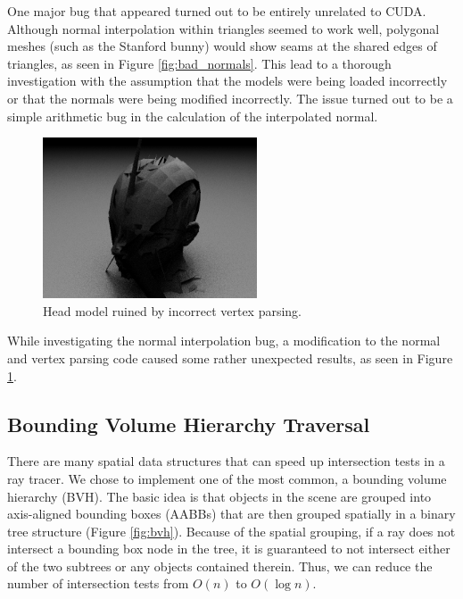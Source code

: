 \documentclass{acmsiggraph}                     %
\begin{document}
    One major bug that appeared turned out to be entirely unrelated to CUDA.  Although normal 
    interpolation within triangles seemed to work well, polygonal meshes (such as the Stanford bunny) would 
    show seams at the shared edges of triangles, as seen in Figure \ref{fig:bad_normals}.
    This lead to a thorough investigation with the assumption that the models were being loaded 
    incorrectly or that the normals were being modified incorrectly. The issue turned out to be 
    a simple arithmetic bug in the calculation of the interpolated normal. 

    \begin{figure}[htb]
        \begin{center}
            \leavevmode
            \includegraphics[width=2.5in]{ruinedhead.jpg}
        \end{center}
        \caption{Head model ruined by incorrect vertex parsing.}
        \label{fig:ruined_head}
    \end{figure}

    While investigating the normal interpolation bug, a modification to the normal and vertex 
    parsing code caused some rather unexpected results, as seen in Figure \ref{fig:ruined_head}.

    \subsection{Bounding Volume Hierarchy Traversal}
    \label{sec:bvhtraversal}

    There are many spatial data structures that can speed up intersection tests in a ray tracer.
    We chose to implement one of the most common, a bounding volume hierarchy (BVH). The basic idea is
    that objects in the scene are grouped into axis-aligned bounding boxes (AABBs) that are
    then grouped spatially in a binary tree structure (Figure \ref{fig:bvh}). Because of the spatial grouping, if a ray
    does not intersect a bounding box node in the tree, it is guaranteed to not intersect either
    of the two subtrees or any objects contained therein. Thus, we can reduce the number of
    intersection tests from $O\left(n\right)$ to $O\left(\log n\right)$.
   
\end{document}
